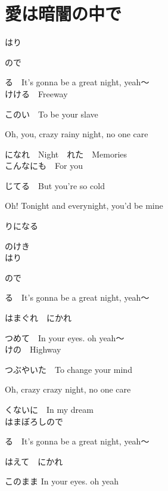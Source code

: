 \section{ 愛は暗闇の中で}
\large{

はり

ので

る　It's gonna be a great night, yeah～
\\

けける　Freeway

このい　To be your slave

Oh, you, crazy rainy night, no one care

になれ　Night　れた　Memories
\\

こんなにも　For you

じてる　But you're so cold

Oh! Tonight and everynight, you'd be mine

りになる

のけき
\\

はり

ので

る　It's gonna be a great night, yeah～

はまぐれ　にかれ

つめて　In your eyes. oh yeah～
\\

けの　Highway

つぶやいた　To change your mind

Oh, crazy crazy night, no one care

くないに　In my dream
\\

はまぼろしので

る　It's gonna be a great night, yeah～

はえて　にかれ

このまま In your eyes. oh yeah
\\

}
